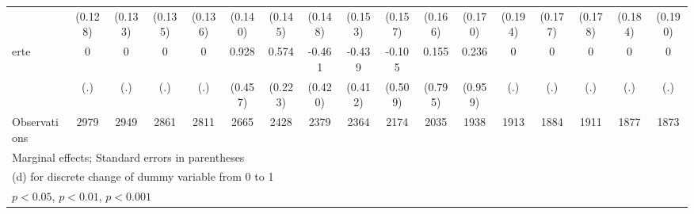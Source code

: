 {\begin{tabular}{l*{16}{c}}
                    &     (0.128)         &     (0.133)         &     (0.135)         &     (0.136)         &     (0.140)         &     (0.145)         &     (0.148)         &     (0.153)         &     (0.157)         &     (0.166)         &     (0.170)         &     (0.194)         &     (0.177)         &     (0.178)         &     (0.184)         &     (0.190)         \\
[1em]
erte                &           0         &           0         &           0         &           0         &       0.928\sym{*}  &       0.574\sym{*}  &      -0.461         &      -0.439         &      -0.105         &       0.155         &       0.236         &           0         &           0         &           0         &           0         &           0         \\
                    &         (.)         &         (.)         &         (.)         &         (.)         &     (0.457)         &     (0.223)         &     (0.420)         &     (0.412)         &     (0.509)         &     (0.795)         &     (0.959)         &         (.)         &         (.)         &         (.)         &         (.)         &         (.)         \\
\hline
Observations        &        2979         &        2949         &        2861         &        2811         &        2665         &        2428         &        2379         &        2364         &        2174         &        2035         &        1938         &        1913         &        1884         &        1911         &        1877         &        1873         \\
\hline\hline
\multicolumn{17}{l}{\footnotesize Marginal effects; Standard errors in parentheses}\\
\multicolumn{17}{l}{\footnotesize  (d) for discrete change of dummy variable from 0 to 1}\\
\multicolumn{17}{l}{\footnotesize \sym{*} \(p<0.05\), \sym{**} \(p<0.01\), \sym{***} \(p<0.001\)}\\
\end{tabular}
}
